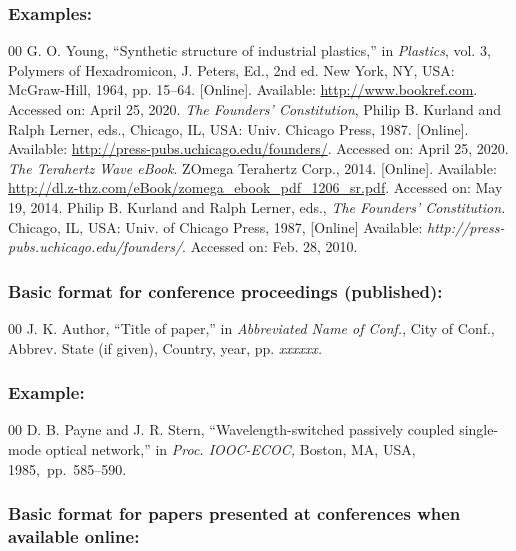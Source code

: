 \documentclass{IEEEoj-data}
\begin{document}
{\subsubsection*{Examples:}

\begin{thebibliography}{00}
 G. O. Young, ``Synthetic structure of industrial
plastics,'' in \emph{Plastics}, vol. 3, Polymers of Hexadromicon, J.
Peters, Ed., 2nd ed. New York, NY, USA: McGraw-Hill, 1964, pp. 15--64.
[Online]. Available: \underline{http://www.bookref.com}. Accessed on: April 25, 2020.
 \textit{The Founders' Constitution}, Philip B. Kurland and Ralph Lerner, eds., Chicago, IL, USA: Univ. Chicago Press, 1987. [Online]. Available: \underline {http://press-pubs.uchicago.edu/founders/}. Accessed on: April 25, 2020.
 \emph{The Terahertz Wave eBook}. ZOmega Terahertz
Corp., 2014. [Online]. Available: \underline{http://dl.z-thz.com/eBook/zomega\_ebook\_pdf\_1206\_sr.pdf}. Accessed on: May 19, 2014.
 Philip B. Kurland and Ralph Lerner, eds., \textit{The
Founders' Constitution. }Chicago, IL, USA: Univ. of Chicago Press, 1987, [Online] Available: \emph{http://press-pubs.uchicago.edu/founders/}. Accessed on: Feb. 28, 2010.
\end{thebibliography}

\subsubsection*{Basic format for conference proceedings (published):}

\begin{thebibliography}{00}
 J. K. Author, ``Title of paper,'' in \textit{Abbreviated Name of Conf.}, City of Conf., Abbrev. State (if
given), Country, year, pp. \textit{xxxxxx.}
\end{thebibliography}

\subsubsection*{Example:}

\begin{thebibliography}{00}
 D. B. Payne and J. R. Stern, ``Wavelength-switched
passively coupled single-mode optical network,'' in \textit{Proc. IOOC-ECOC, }Boston, MA, USA, 1985,~pp.~585--590.
\end{thebibliography}

\subsubsection*{Basic format for papers presented at conferences when available online: }

}
\end{document}
